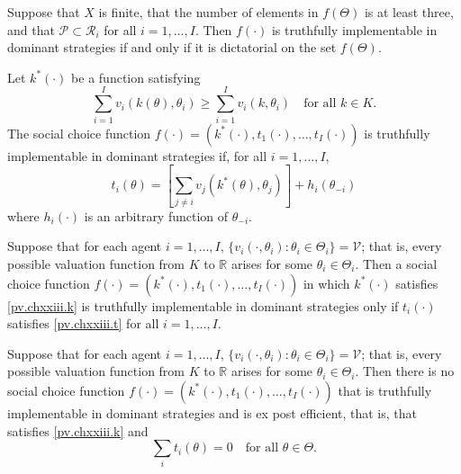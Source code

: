 \begin{cor}
    Suppose that $X$ is finite, that the number of elements in $f(\Theta)$ is at least three, and that $\mathscr{P} \subset \mathscr{R}_i$ for all $i = 1, \dots, I$. Then $f(\cdot)$ is truthfully implementable in dominant strategies if and only if it is dictatorial on the set $f(\Theta)$.
\end{cor}

\addtocounter{equation}{6}

\begin{prop}
    Let $k^*(\cdot)$ be a function satisfying
    \begin{equation}\label{pv.chxxiii.k}
        \sum_{i = 1}^I v_i(k(\theta), \theta_i) \geq \sum_{i = 1}^I v_i(k, \theta_i) \quad \text{for all } k \in K.
    \end{equation}
    The social choice function $f(\cdot) = (k^*(\cdot), t_1(\cdot), \dots, t_I(\cdot))$ is truthfully implementable in dominant strategies if, for all $i = 1, \dots, I$,
    \begin{equation}\label{pv.chxxiii.t}
        t_i(\theta) = \left[ \sum_{j \neq i} v_j(k^*(\theta), \theta_j) \right] + h_i(\theta_{-i})
    \end{equation}
    where $h_i(\cdot)$ is an arbitrary function of $\theta_{-i}$.
\end{prop}

\begin{prop}
    Suppose that for each agent $i = 1, \dots, I$, $\{v_i(\cdot, \theta_i) : \theta_i \in \Theta_i\} = \mathscr{V}$; that is, every possible valuation function from $K$ to $\mathbb{R}$ arises for some $\theta_i \in \Theta_i$. Then a social choice function $f(\cdot) = (k^*(\cdot), t_1(\cdot), \dots, t_I(\cdot))$ in which $k^*(\cdot)$ satisfies \ref{pv.chxxiii.k} is truthfully implementable in dominant strategies only if $t_i(\cdot)$ satisfies \ref{pv.chxxiii.t} for all $i = 1, \dots, I$.
\end{prop}

\begin{prop}
    Suppose that for each agent $i = 1, \dots, I$, $\{v_i(\cdot, \theta_i) : \theta_i \in \Theta_i\} = \mathscr{V}$; that is, every possible valuation function from $K$ to $\mathbb{R}$ arises for some $\theta_i \in \Theta_i$. Then there is no social choice function $f(\cdot) = (k^*(\cdot), t_1(\cdot), \dots, t_I(\cdot))$ that is truthfully implementable in dominant strategies and is ex post efficient, that is, that satisfies \ref{pv.chxxiii.k} and
    \begin{equation*}
        \sum_i t_i(\theta) = 0 \quad \text{for all } \theta \in \Theta.
    \end{equation*}
\end{prop}



